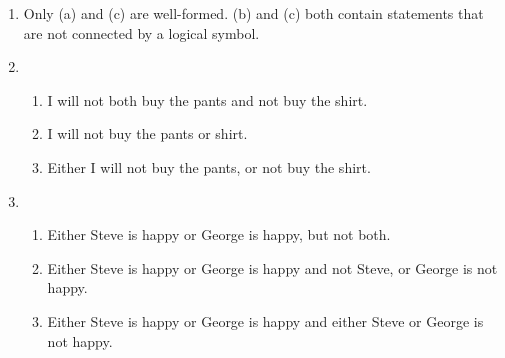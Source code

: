 \documentclass{article}
\begin{document}
\begin{enumerate}
\begin{enumerate}
  \end{enumerate}
\item Only (a) and (c) are well-formed.  (b) and (c) both contain statements that are not connected by a logical symbol.
\item
  \begin{enumerate}
  \item I will not both buy the pants and not buy the shirt.
  \item I will not buy the pants or shirt.
  \item Either I will not buy the pants, or not buy the shirt.
  \end{enumerate}
\item
  \begin{enumerate}
  \item Either Steve is happy or George is happy, but not both.
  \item Either Steve is happy or George is happy and not Steve, or George is not happy.
  \item Either Steve is happy or George is happy and either Steve or George is not happy.
  \end{enumerate}
\end{enumerate}
\end{document}
